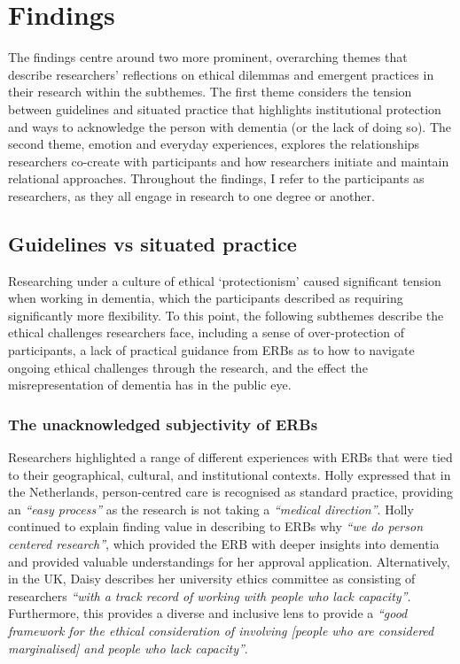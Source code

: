 \section{Findings}
\label{Ethics:Findings}
The findings centre around two more prominent, overarching themes that describe researchers’ reflections on ethical dilemmas and emergent practices in their research within the subthemes. The first theme considers the tension between guidelines and situated practice that highlights institutional protection and ways to acknowledge the person with dementia (or the lack of doing so). The second theme, emotion and everyday experiences, explores the relationships researchers co-create with participants and how researchers initiate and maintain relational approaches. Throughout the findings, I refer to the participants as researchers, as they all engage in research to one degree or another.

\subsection{Guidelines vs situated practice}
\label{Ethics:ThemeOne}
Researching under a culture of ethical `protectionism' caused significant tension when working in dementia, which the participants described as requiring significantly more flexibility. To this point, the following subthemes describe the ethical challenges researchers face, including a sense of over-protection of participants, a lack of practical guidance from ERBs as to how to navigate ongoing ethical challenges through the research, and the effect the misrepresentation of dementia has in the public eye.

\subsubsection{The unacknowledged subjectivity of ERBs}
\label{Ethics:ThemOnePartOne}
Researchers highlighted a range of different experiences with ERBs that were tied to their geographical, cultural, and institutional contexts. Holly expressed that in the Netherlands, person-centred care is recognised as standard practice, providing an \textit{``easy process''} as the research is not taking a \textit{``medical direction''}. Holly continued to explain finding value in describing to ERBs why \textit{``we do person centered research''}, which provided the ERB with deeper insights into dementia and provided valuable understandings for her approval application.  Alternatively, in the UK, Daisy describes her university ethics committee as consisting of researchers \textit{``with a track record of working with people who lack capacity''}. Furthermore, this provides a diverse and inclusive lens to provide a \textit{``good framework for the ethical consideration of involving [people who are considered marginalised] and people who lack capacity''}. 

